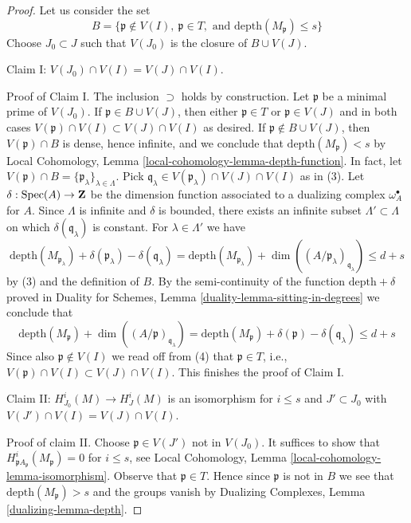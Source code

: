 \begin{proof}
Let us consider the set
$$
B = \{\mathfrak p \not \in V(I),\ \mathfrak p \in T,\text{ and }
\text{depth}(M_\mathfrak p) \leq s\}
$$
Choose $J_0 \subset J$ such that $V(J_0)$ is the closure of $B \cup V(J)$.

\medskip\noindent
Claim I: $V(J_0) \cap V(I) = V(J) \cap V(I)$.

\medskip\noindent
Proof of Claim I. The inclusion $\supset$ holds by construction.
Let $\mathfrak p$ be a minimal prime of $V(J_0)$.
If $\mathfrak p \in B \cup V(J)$, then either $\mathfrak p \in T$
or $\mathfrak p \in V(J)$ and in both cases
$V(\mathfrak p) \cap V(I) \subset V(J) \cap V(I)$ as desired.
If $\mathfrak p \not \in B \cup V(J)$, then
$V(\mathfrak p) \cap B$ is dense, hence infinite, and we conclude that
$\text{depth}(M_\mathfrak p) < s$ by
Local Cohomology, Lemma \ref{local-cohomology-lemma-depth-function}.
In fact, let
$V(\mathfrak p) \cap B = \{\mathfrak p_\lambda\}_{\lambda \in \Lambda}$.
Pick $\mathfrak q_\lambda \in V(\mathfrak p_\lambda) \cap V(J) \cap V(I)$
as in (3).
Let $\delta : \mathop{\mathrm{Spec}}(A) \to \mathbf{Z}$ be the dimension function
associated to a dualizing complex $\omega_A^\bullet$ for $A$.
Since $\Lambda$ is infinite and $\delta$ is bounded,
there exists an infinite subset $\Lambda' \subset \Lambda$ on which
$\delta(\mathfrak q_\lambda)$ is constant. For
$\lambda \in \Lambda'$ we have
$$
\text{depth}(M_{\mathfrak p_\lambda}) +
\delta(\mathfrak p_\lambda) - \delta(\mathfrak q_\lambda) =
\text{depth}(M_{\mathfrak p_\lambda}) +
\dim((A/\mathfrak p_\lambda)_{\mathfrak q_\lambda})
\leq d + s
$$
by (3) and the definition of $B$. By the semi-continuity of
the function $\text{depth} + \delta$ proved in
Duality for Schemes, Lemma \ref{duality-lemma-sitting-in-degrees}
we conclude that
$$
\text{depth}(M_\mathfrak p) +
\dim((A/\mathfrak p)_{\mathfrak q_\lambda}) =
\text{depth}(M_\mathfrak p) + \delta(\mathfrak p) - \delta(\mathfrak q_\lambda)
\leq d + s
$$
Since also $\mathfrak p \not \in V(I)$ we read off from (4) that
$\mathfrak p \in T$, i.e.,
$V(\mathfrak p) \cap V(I) \subset V(J) \cap V(I)$. This finishes the
proof of Claim I.

\medskip\noindent
Claim II: $H^i_{J_0}(M) \to H^i_J(M)$ is an isomorphism for $i \leq s$
and $J' \subset J_0$ with $V(J') \cap V(I) = V(J) \cap V(I)$.

\medskip\noindent
Proof of claim II. Choose $\mathfrak p \in V(J')$ not in $V(J_0)$.
It suffices to show that $H^i_{\mathfrak pA_\mathfrak p}(M_\mathfrak p) = 0$
for $i \leq s$, see
Local Cohomology, Lemma \ref{local-cohomology-lemma-isomorphism}.
Observe that $\mathfrak p \in T$. Hence since $\mathfrak p$ is not in $B$
we see that $\text{depth}(M_\mathfrak p) > s$ and the groups vanish by
Dualizing Complexes, Lemma \ref{dualizing-lemma-depth}.


\end{proof}
